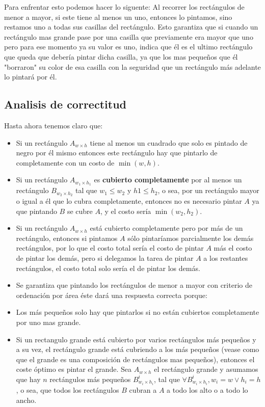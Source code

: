 \documentclass{article}
\begin{document}
Para enfrentar esto podemos hacer lo siguente: Al recorrer los rectángulos de menor a mayor, si este tiene al menos un uno, entonces lo pintamos, sino restamos uno a todas sus casillas del rectángulo. Esto garantiza que si cuando un rectángulo mas grande pase por una casilla que previamente era mayor que uno pero para ese momento ya su valor es uno, indica que él es el ultimo rectángulo que queda que debería pintar dicha casilla, ya que los mas pequeños que él "borraron" su color de esa casilla con la seguridad que un rectángulo más adelante lo pintará por él.
\subsection{Analisis de correctitud}
	Hasta ahora tenemos claro que:
	\begin{itemize}
	
\item Si un rectángulo $A_{w \times h}$ tiene al menos un cuadrado que solo es pintado de negro por él mismo entonces este rectángulo hay que pintarlo de completamente con un costo de $\min {(w, h)}$.

\item Si un rectángulo $A_{w_1 \times h_1}$ es \textbf{cubierto completamente} por al menos un rectángulo $B_{ w_2 \times h_2}$ tal que $w_1 \leq w_2$ y $h1 \leq h_2$, o sea, por un rectángulo mayor o igual a él que lo cubra completamente, entonces no es necesario pintar $A$ ya que pintando $B$ se cubre $A$, y el costo sería $\min{(w_2, h_2)}$.
\item Si un rectángulo $A_{w \times h}$ está cubierto completamente pero por más de un rectángulo, entonces si pintamos $A$ sólo pintaríamos parcialmente los demás rectángulos, por lo que el costo total sería el costo de pintar $A$ más el costo de pintar los demás, pero si delegamos la tarea de pintar $A$ a los restantes rectángulos, el costo total solo sería el de pintar los demás.
\item Se garantiza que pintando los rectángulos de menor a mayor con criterio de ordenación por área éste dará una respuesta correcta porque:
  
\item Los más pequeños solo hay que pintarlos si no están cubiertos completamente por uno mas grande.
\item Si un rectangulo grande está cubierto por varios rectángulos más pequeños y a su vez, el rectángulo grande está cubriendo a los más pequeños (vease como que el grande es una composición de rectángulos mas pequeños), entonces el coste óptimo es pintar el grande. Sea $A_{w \times h}$ el rectángulo grande y asumamos que hay $n$ rectángulos más pequeños $B^{i}_{w_i \times h_i}$, tal que $\forall B^{i}_{w_i \times h_i}, w_i = w \lor h_i = h$, o sea, que todos los rectángulos $B$ cubran a $A$ a todo los alto o a todo lo ancho. 
  
  \end{itemize}
\end{document}
